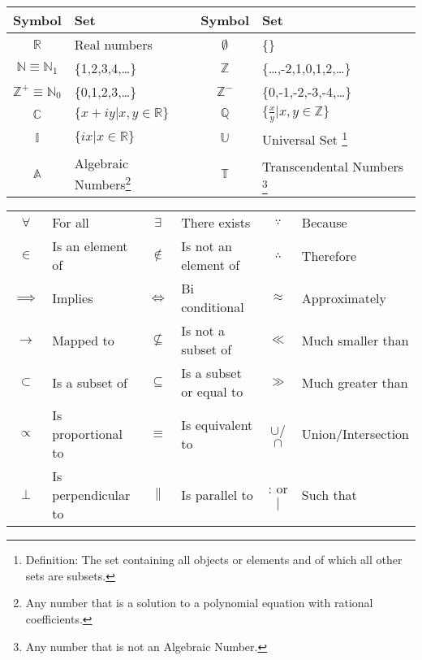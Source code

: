 \begin{fancybox}{}
	\begin{center}
		\begin{tabular}{c|l||c|l}
			Symbol &  Set  & Symbol & Set   \\
			\hline
			$\mathbb{R}$ & Real numbers & $\emptyset$ & \{\} \\
			$\mathbb{N}\equiv \mathbb{N}_1$ & \{1,2,3,4,\dots\} & $\mathbb{Z}$ & \{\dots,-2,1,0,1,2,\dots\} \\
			$\mathbb{Z}^+ \equiv \mathbb{N}_0$ & \{0,1,2,3,\dots\} & $\mathbb{Z}^-$ & \{0,-1,-2,-3,-4,\dots\} \\
			$\mathbb{C}$ & $\{x+iy | x,y \in \mathbb{R}\}$ & $\mathbb{Q}$ & $\{\frac{x}{y} | x,y \in \mathbb{Z}\}$ \\
			$\mathbb{I}$ & $\{ix|x\in \mathbb{R}\}$ & $\mathbb{U}$ & Universal Set \footnote{Definition: The set containing all objects or elements and of which all other sets are subsets.} \\
			$\mathbb{A}$ & Algebraic Numbers\footnote{Any number that is a solution to a polynomial equation with rational coefficients.} & $\mathbb{T}$ & Transcendental Numbers \footnote{Any number that is not an Algebraic Number.} 
		\end{tabular}
	\end{center}
\end{fancybox}

\begin{fancybox}{}
	\begin{center}
		\begin{tabular}{c|l||c|l||c|l}
			$\forall$ & For all & $\exists$ & There exists & $\because$ & Because\\ 
			$\in$ & Is an element of & $\notin$ & Is not an element of  & $\therefore$ & Therefore\\
			$\implies$ & Implies & $\Longleftrightarrow$ & Bi conditional & $\approx$ & Approximately\\
			$\longrightarrow$ & Mapped to & $\nsubseteq$ & Is not a subset of & $\ll$ & Much smaller than\\
			$\subset$& Is a subset of & $\subseteq$ & Is a subset or equal to  & $\gg$ & Much greater than\\
			$\propto$ & Is proportional to & $\equiv$ & Is equivalent to  & $\cup$/$\cap$ & Union/Intersection \\
			$\perp$ & Is perpendicular to & $\parallel$ & Is parallel to  & : or $|$ & Such that\\
		\end{tabular}
	\end{center}
\end{fancybox}

